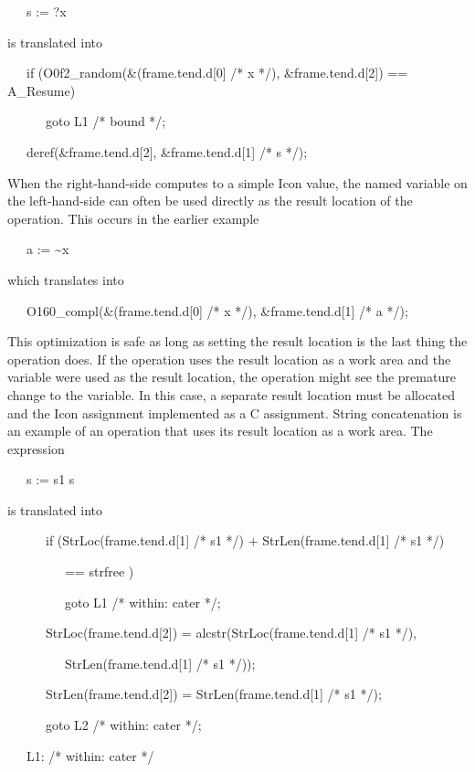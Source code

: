 {\ttfamily\mdseries
\ \ \ s := ?x}

\noindent is translated into 

{\ttfamily\mdseries
\ \ \ if (O0f2\_random(\&(frame.tend.d[0] /* x */), \&frame.tend.d[2]) == A\_Resume)}

{\ttfamily\mdseries
\ \ \ \ \ \ goto L1 /* bound */;}

{\ttfamily\mdseries
\ \ \ deref(\&frame.tend.d[2], \&frame.tend.d[1] /* s */);}


When the right-hand-side computes to a simple Icon value, the named
variable on the left-hand-side can often be used directly as the
result location of the operation. This occurs in the earlier example

{\ttfamily\mdseries
\ \ \ a := \~{}x}

\noindent which translates into

{\ttfamily\mdseries
\ \ \ O160\_compl(\&(frame.tend.d[0] /* x */), \&frame.tend.d[1] /* a */);}


This optimization is safe as long as setting the result location is
the last thing the operation does. If the operation uses the result
location as a work area and the variable were used as the result
location, the operation might see the premature change to the
variable. In this case, a separate result location must be allocated
and the Icon assignment implemented as a C assignment. String
concatenation is an example of an operation that uses its result
location as a work area. The expression

{\ttfamily\mdseries
\ \ \ s := s1 {\textbar}{\textbar} s}


is translated into 

{\ttfamily\mdseries
\ \ \ \ \ \ if (StrLoc(frame.tend.d[1] /* s1 */) + StrLen(frame.tend.d[1] /* s1 */)}

{\ttfamily\mdseries
\ \ \ \ \ \ \ \ \ == strfree )}

{\ttfamily\mdseries
\ \ \ \ \ \ \ \ \ goto L1 /* within: cater */;}

{\ttfamily\mdseries
\ \ \ \ \ \ StrLoc(frame.tend.d[2]) = alcstr(StrLoc(frame.tend.d[1] /* s1 */),}

{\ttfamily\mdseries
\ \ \ \ \ \ \ \ \ StrLen(frame.tend.d[1] /* s1 */));}

{\ttfamily\mdseries
\ \ \ \ \ \ StrLen(frame.tend.d[2]) = StrLen(frame.tend.d[1] /* s1 */);}

{\ttfamily\mdseries
\ \ \ \ \ \ goto L2 /* within: cater */;}

{\ttfamily\mdseries
\ \ \ L1: /* within: cater */}

